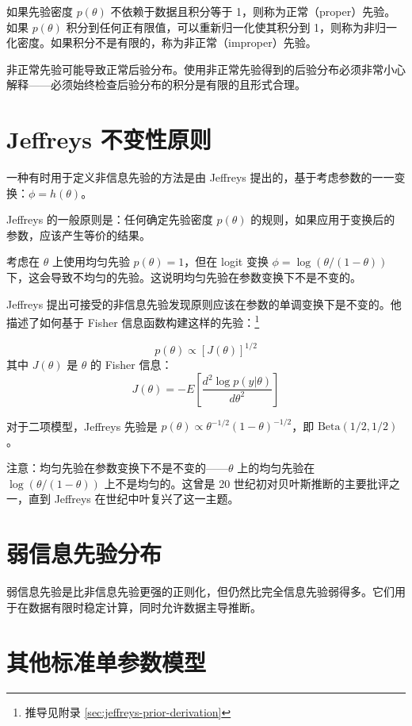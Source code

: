 \begin{Definition}
  如果先验密度 $p(\theta)$ 不依赖于数据且积分等于 1，则称为正常（proper）先验。如果 $p(\theta)$ 积分到任何正有限值，可以重新归一化使其积分到 1，则称为非归一化密度。如果积分不是有限的，称为非正常（improper）先验。
\end{Definition}

非正常先验可能导致正常后验分布。使用非正常先验得到的后验分布必须非常小心解释——必须始终检查后验分布的积分是有限的且形式合理。

\section{Jeffreys 不变性原则}

一种有时用于定义非信息先验的方法是由 Jeffreys 提出的，基于考虑参数的一一变换：$\phi = h(\theta)$。

Jeffreys 的一般原则是：任何确定先验密度 $p(\theta)$ 的规则，如果应用于变换后的参数，应该产生等价的结果。

考虑在 $\theta$ 上使用均匀先验 $p(\theta) = 1$，但在 logit 变换 $\phi = \log(\theta/(1-\theta))$ 下，这会导致不均匀的先验。这说明均匀先验在参数变换下不是不变的。

Jeffreys 提出可接受的非信息先验发现原则应该在参数的单调变换下是不变的。他描述了如何基于 Fisher 信息函数构建这样的先验：\footnote{推导见附录 \cref{sec:jeffreys-prior-derivation}}

\[
p(\theta) \propto [J(\theta)]^{1/2}
\]
其中 $J(\theta)$ 是 $\theta$ 的 Fisher 信息：
\[
J(\theta) = -E\left[\frac{d^2 \log p(y|\theta)}{d\theta^2}\right]
\]

对于二项模型，Jeffreys 先验是 $p(\theta) \propto \theta^{-1/2}(1-\theta)^{-1/2}$，即 $\text{Beta}(1/2, 1/2)$。

注意：均匀先验在参数变换下不是不变的——$\theta$ 上的均匀先验在 $\log(\theta/(1-\theta))$ 上不是均匀的。这曾是 20 世纪初对贝叶斯推断的主要批评之一，直到 Jeffreys 在世纪中叶复兴了这一主题。

\section{弱信息先验分布}

弱信息先验是比非信息先验更强的正则化，但仍然比完全信息先验弱得多。它们用于在数据有限时稳定计算，同时允许数据主导推断。

\section{其他标准单参数模型}

